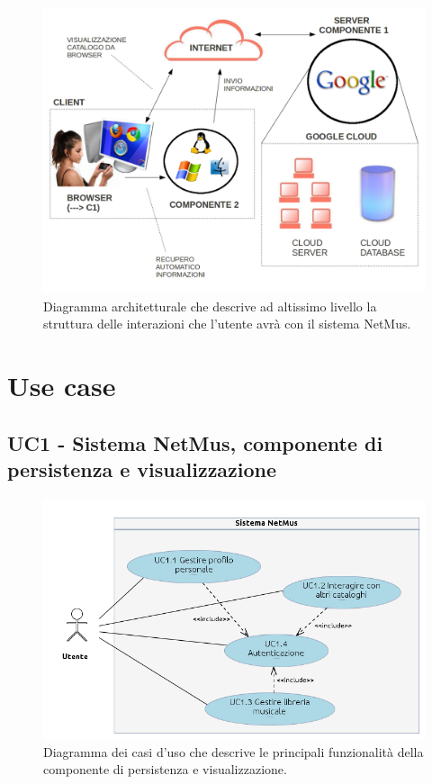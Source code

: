 \begin{figure}[h]
  \centering
  \includegraphics[width=16cm]{img/AR/DiagrammaArchitetturale.png}
\caption{Diagramma architetturale che descrive ad altissimo livello la
struttura delle interazioni che l'utente avr\`a con il sistema NetMus. }
\end{figure}

\chapter{Use case}
\thispagestyle{fancy}

\section{UC1 - Sistema NetMus, componente di persistenza e visualizzazione}

\begin{figure}[h]
  \centering
  \includegraphics[width=14.5cm]{img/AR/UC1.png}
\caption{Diagramma dei casi d'uso che descrive le principali funzionalit\`a della
componente di persistenza e visualizzazione.}
\end{figure}

